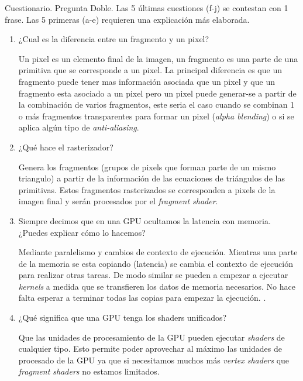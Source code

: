 
\begin{pregunta}{Cuestionario. Pregunta Doble. Las 5 últimas cuestiones (f-j) se contestan con 1 frase. Las 5
primeras (a-e) requieren una explicación más elaborada.}

\begin{enumerate}[label=(\alph*)]
    \item ¿Cual es la diferencia entre un fragmento y un pixel?

        Un pixel es un elemento final de la imagen, un fragmento es una parte de
        una primitiva que se corresponde a un pixel. La principal diferencia es
        que un fragmento puede tener mas información asociada que un pixel y que
        un fragmento esta asociado a un pixel pero un pixel puede generar-se a
        partir de la combinación de varios fragmentos, este seria el caso cuando
        se combinan 1 o más fragmentos transparentes para formar un pixel
        (\emph{alpha blending}) o si se aplica algún tipo de
        \emph{anti-aliasing}.

    \item ¿Qué hace el rasterizador?

        Genera los fragmentos (grupos de pixels que forman parte de un mismo
        triangulo) a partir de la información de las ecuaciones de
        triángulos de las primitivas. Estos fragmentos rasterizados se
        corresponden a pixels de la imagen final y serán procesados por el
        \emph{fragment shader}.

    \item Siempre decimos que en una GPU ocultamos la latencia con memoria. ¿Puedes explicar cómo lo hacemos?

        Mediante paralelismo y cambios de contexto de ejecución. Mientras una
        parte de la memoria se esta copiando (latencia) se cambia el contexto de
        ejecución para realizar otras tareas. De modo similar se pueden a
        empezar a ejecutar \emph{kernels} a medida que se transfieren los datos
        de memoria necesarios. No hace falta esperar a terminar todas las copias
        para empezar la ejecución. \cite{volkov_understanding_nodate}.

    \item ¿Qué significa que una GPU tenga los shaders unificados?

        Que las unidades de procesamiento de la GPU pueden ejecutar
        \emph{shaders} de cualquier tipo. Esto permite poder aprovechar al
        máximo las unidades de procesado de la GPU ya que si necesitamos muchos
        más \emph{vertex shaders} que \emph{fragment shaders} no estamos
        limitados.


\end{enumerate}
\end{pregunta}
